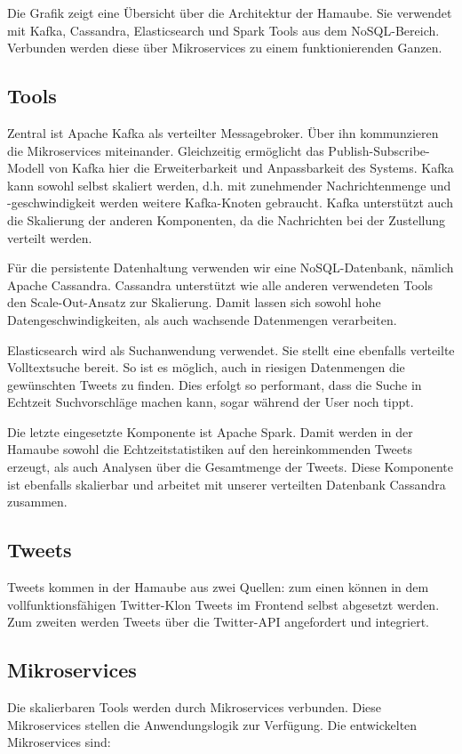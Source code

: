 Die Grafik zeigt eine Übersicht über die Architektur der Hamaube. Sie
verwendet mit Kafka, Cassandra, Elasticsearch und Spark Tools aus dem
NoSQL-Bereich. Verbunden werden diese über Mikroservices zu einem
funktionierenden Ganzen.

\subsection{Tools}
Zentral ist Apache Kafka als verteilter Messagebroker. Über ihn
kommunzieren die Mikroservices miteinander. Gleichzeitig ermöglicht das
Publish-Subscribe-Modell von Kafka hier die Erweiterbarkeit und
Anpassbarkeit des Systems. Kafka  kann sowohl selbst skaliert werden,
d.h. mit zunehmender Nachrichtenmenge und -geschwindigkeit werden
weitere Kafka-Knoten gebraucht. Kafka unterstützt auch die Skalierung
der anderen Komponenten, da die Nachrichten bei der Zustellung verteilt
werden.

Für die persistente Datenhaltung verwenden wir eine NoSQL-Datenbank, nämlich
Apache Cassandra. Cassandra unterstützt wie alle anderen verwendeten
Tools den Scale-Out-Ansatz zur Skalierung. Damit lassen sich sowohl
hohe Datengeschwindigkeiten, als auch wachsende Datenmengen
verarbeiten.

Elasticsearch wird als Suchanwendung verwendet. Sie stellt eine
ebenfalls verteilte Volltextsuche bereit. So ist es möglich, auch in
riesigen Datenmengen die gewünschten Tweets zu finden. Dies erfolgt so
performant, dass die Suche in Echtzeit Suchvorschläge machen kann,
sogar während der User noch tippt.

Die letzte eingesetzte Komponente ist Apache Spark. Damit werden in der
Hamaube sowohl die Echtzeitstatistiken auf den hereinkommenden Tweets
erzeugt, als auch Analysen über die Gesamtmenge der Tweets. Diese
Komponente ist ebenfalls skalierbar und arbeitet mit unserer verteilten
Datenbank Cassandra zusammen.

\subsection{Tweets}
Tweets kommen in der Hamaube aus zwei Quellen: zum einen können in dem
vollfunktionsfähigen Twitter-Klon Tweets im Frontend selbst abgesetzt
werden. Zum zweiten werden Tweets über die Twitter-API angefordert und
integriert.

\subsection{Mikroservices}
Die skalierbaren Tools werden durch Mikroservices verbunden. Diese
Mikroservices stellen die Anwendungslogik zur Verfügung. Die
entwickelten Mikroservices sind:

